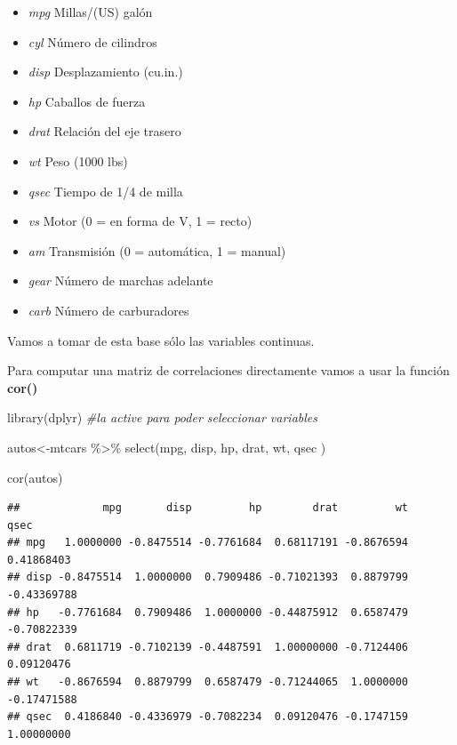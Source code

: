 \documentclass[
]{book}
\newenvironment{Shaded}{\begin{snugshade}}{\end{snugshade}}
\newcommand{\CommentTok}[1]{\textcolor[rgb]{0.56,0.35,0.01}{\textit{#1}}}
\newcommand{\FunctionTok}[1]{\textcolor[rgb]{0.00,0.00,0.00}{#1}}
\newcommand{\NormalTok}[1]{#1}
\newcommand{\OtherTok}[1]{\textcolor[rgb]{0.56,0.35,0.01}{#1}}
\newcommand{\SpecialCharTok}[1]{\textcolor[rgb]{0.00,0.00,0.00}{#1}}
\begin{document}
\begin{itemize}
\item
  \emph{mpg} Millas/(US) galón
\item
  \emph{cyl} Número de cilindros
\item
  \emph{disp} Desplazamiento (cu.in.)
\item
  \emph{hp} Caballos de fuerza
\item
  \emph{drat} Relación del eje trasero
\item
  \emph{wt} Peso (1000 lbs)
\item
  \emph{qsec} Tiempo de 1/4 de milla
\item
  \emph{vs} Motor (0 = en forma de V, 1 = recto)
\item
  \emph{am} Transmisión (0 = automática, 1 = manual)
\item
  \emph{gear} Número de marchas adelante
\item
  \emph{carb} Número de carburadores
\end{itemize}

Vamos a tomar de esta base sólo las variables continuas.

Para computar una matriz de correlaciones directamente vamos a usar la función \textbf{cor()}

\begin{Shaded}
\begin{Highlighting}[]
\FunctionTok{library}\NormalTok{(dplyr) }\CommentTok{\#la active para poder seleccionar variables}

\NormalTok{autos}\OtherTok{\textless{}{-}}\NormalTok{mtcars }\SpecialCharTok{\%\textgreater{}\%} \FunctionTok{select}\NormalTok{(mpg, disp, hp, drat, wt, qsec )}


\FunctionTok{cor}\NormalTok{(autos)}
\end{Highlighting}
\end{Shaded}

\begin{verbatim}
##             mpg       disp         hp        drat         wt        qsec
## mpg   1.0000000 -0.8475514 -0.7761684  0.68117191 -0.8676594  0.41868403
## disp -0.8475514  1.0000000  0.7909486 -0.71021393  0.8879799 -0.43369788
## hp   -0.7761684  0.7909486  1.0000000 -0.44875912  0.6587479 -0.70822339
## drat  0.6811719 -0.7102139 -0.4487591  1.00000000 -0.7124406  0.09120476
## wt   -0.8676594  0.8879799  0.6587479 -0.71244065  1.0000000 -0.17471588
## qsec  0.4186840 -0.4336979 -0.7082234  0.09120476 -0.1747159  1.00000000
\end{verbatim}
\end{document}

